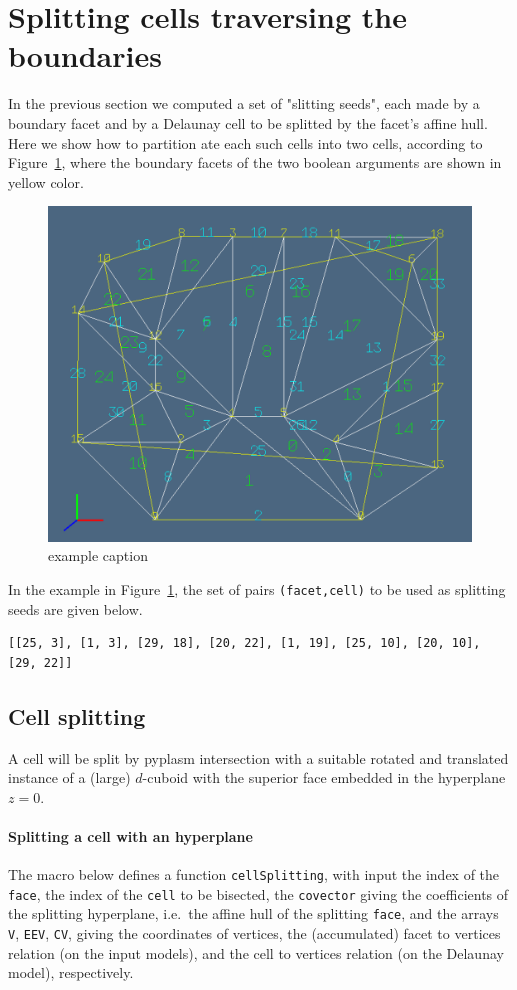 \documentclass[11pt,oneside]{article}	%
\begin{document}
\section{Splitting cells traversing the boundaries}

In the previous section we computed a set of "slitting seeds", each made by a boundary facet and by a Delaunay cell to be splitted by the facet's affine hull. Here we show how to partition ate each such cells into two cells, according to Figure~\ref{fig:splitting}, where the boundary facets of the two boolean arguments are shown in yellow color.

\begin{figure}[htbp] %
   \centering
   \includegraphics[width=0.6\linewidth]{images/splitting} 
   \caption{example caption}
   \label{fig:splitting}
\end{figure}

In the example in Figure~\ref{fig:splitting}, the set of pairs \texttt{(facet,cell)} to be used as splitting seeds are given below.
{\small
\begin{verbatim}
[[25, 3], [1, 3], [29, 18], [20, 22], [1, 19], [25, 10], [20, 10], [29, 22]]
\end{verbatim}}

\subsection{Cell splitting}

A cell will be split by pyplasm intersection with a suitable rotated and translated instance of a (large) $d$-cuboid with the superior face embedded in the hyperplane $z=0$.

\paragraph{Splitting a cell with an hyperplane}
The macro below defines a function \texttt{cellSplitting}, with input the index of the \texttt{face}, the index of the \texttt{cell} to be bisected, the \texttt{covector} giving the coefficients of the splitting hyperplane, i.e.~the affine hull of the splitting \texttt{face}, and the arrays \texttt{V}, \texttt{EEV}, \texttt{CV}, giving the coordinates of vertices, the (accumulated) facet to vertices relation (on the input models), and the cell to vertices relation (on the Delaunay model), respectively. 
\end{document}
